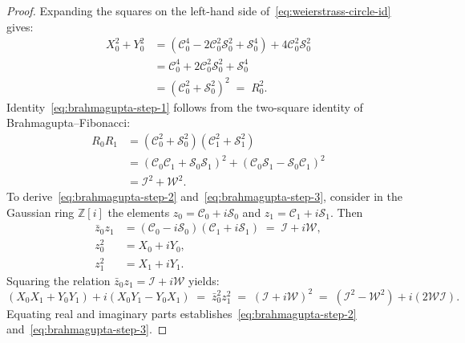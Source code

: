 \documentclass[11pt,a4paper]{article}
\theoremstyle{plain}
\theoremstyle{definition}
\begin{document}
\begin{proof}
Expanding the squares on the left-hand side of~\eqref{eq:weierstrass-circle-id} gives:
\begin{align*}
  X_0^2 + Y_0^2 &= (\mathcal{C}_0^4 - 2\mathcal{C}_0^2\mathcal{S}_0^2 + \mathcal{S}_0^4) + 4\mathcal{C}_0^2\mathcal{S}_0^2 \\
  &= \mathcal{C}_0^4 + 2\mathcal{C}_0^2\mathcal{S}_0^2 + \mathcal{S}_0^4 \\
  &= (\mathcal{C}_0^2 + \mathcal{S}_0^2)^2 \;=\; R_0^2.
\end{align*}
Identity~\eqref{eq:brahmagupta-step-1} follows from the two-square identity of Brahmagupta--Fibonacci:
\begin{align*}
  R_0 R_1 &= (\mathcal{C}_0^2 + \mathcal{S}_0^2)(\mathcal{C}_1^2 + \mathcal{S}_1^2) \\
  &= (\mathcal{C}_0\mathcal{C}_1 + \mathcal{S}_0\mathcal{S}_1)^2 + (\mathcal{C}_0\mathcal{S}_1 - \mathcal{S}_0\mathcal{C}_1)^2 \\
  &= \mathcal{I}^2 + \mathcal{W}^2.
\end{align*}
To derive~\eqref{eq:brahmagupta-step-2} and~\eqref{eq:brahmagupta-step-3}, consider in the Gaussian ring $\mathbb{Z}[i]$ the elements $z_0 = \mathcal{C}_0 + i\mathcal{S}_0$ and $z_1 = \mathcal{C}_1 + i\mathcal{S}_1$. Then
\begin{align*}
  \bar{z}_0 z_1 &= (\mathcal{C}_0 - i\mathcal{S}_0)(\mathcal{C}_1 + i\mathcal{S}_1) \;=\; \mathcal{I} + i\mathcal{W}, \\
  z_0^2 &= X_0 + iY_0, \\
  z_1^2 &= X_1 + iY_1.
\end{align*}
Squaring the relation $\bar{z}_0 z_1 = \mathcal{I} + i\mathcal{W}$ yields:
\begin{equation*}
  (X_0 X_1 + Y_0 Y_1) + i(X_0 Y_1 - Y_0 X_1) \;=\; \bar{z}_0^2 z_1^2 \;=\; (\mathcal{I} + i\mathcal{W})^2 \;=\; (\mathcal{I}^2 - \mathcal{W}^2) + i(2\mathcal{W}\mathcal{I}).
\end{equation*}
Equating real and imaginary parts establishes~\eqref{eq:brahmagupta-step-2} and~\eqref{eq:brahmagupta-step-3}.
\end{proof}
\end{document}
